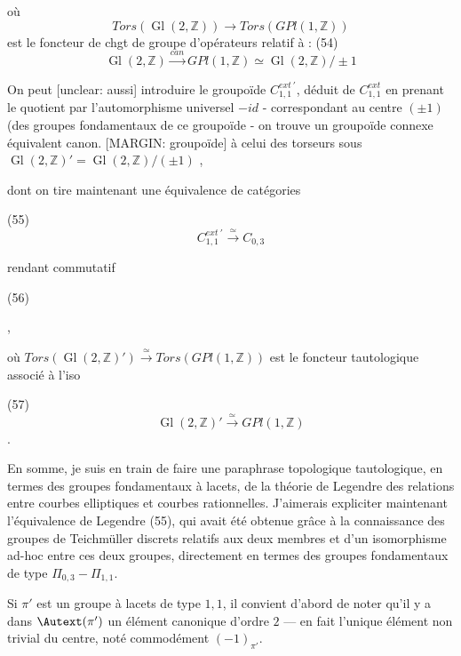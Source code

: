 où
$$Tors(\operatorname{Gl}(2,\mathbb{Z})) \longrightarrow Tors(GPl(1,\mathbb{Z}))$$
est le foncteur de chgt de groupe d'opérateurs
relatif à :
(54) $$\operatorname{Gl}(2,\mathbb{Z}) \xrightarrow{can} GPl(1,\mathbb{Z}) \simeq \operatorname{Gl}(2,\mathbb{Z}) / \pm 1$$

\newpage


On peut [unclear: aussi] introduire le groupoïde
$C_{1,1}^{ext \ \prime}$, déduit de $C_{1,1}^{ext}$ en prenant le
quotient par l'automorphisme universel $-id$
- correspondant au centre $(\pm 1)$ (des groupes
fondamentaux de ce groupoïde - on trouve
un groupoïde connexe équivalent canon.
[MARGIN: groupoïde] à celui des torseurs sous $\operatorname{Gl}(2,\mathbb{Z})'= \operatorname{Gl}(2,\mathbb{Z})/(\pm 1)$ ,

dont on tire maintenant une
équivalence de catégories

(55) $$C_{1,1}^{ext \ \prime} \overset{\simeq}{\longrightarrow} C_{0,3}$$

rendant commutatif

(56)
,

où $Tors(\operatorname{Gl}(2,\mathbb{Z})') \overset{\simeq}{\longrightarrow} Tors(GPl(1,\mathbb{Z}))$ est
le foncteur tautologique associé à l'iso

(57) $$\operatorname{Gl}(2,\mathbb{Z})' \overset{\simeq}{\longrightarrow} GPl(1,\mathbb{Z})$$ .

\newpage


En somme, je suis en train de faire une paraphrase topologique tautologique, en termes des groupes fondamentaux à lacets, de la théorie de Legendre des relations entre courbes elliptiques et courbes rationnelles. J'aimerais expliciter maintenant l'équivalence de Legendre (55), qui avait été obtenue grâce à la connaissance des groupes de Teichmüller discrets relatifs aux deux membres et d'un isomorphisme ad-hoc entre ces deux groupes, directement en termes des groupes fondamentaux de type $\Pi_{0,3} - \Pi_{1,1}$.

Si $\pi'$ est un groupe à lacets de type $1,1$, il convient d'abord de noter qu'il y a dans $\Autext(\pi')$ un élément canonique d'ordre $2$ --- en fait l'unique élément non trivial du centre, noté commodément $(-1)_{\pi'}$.

